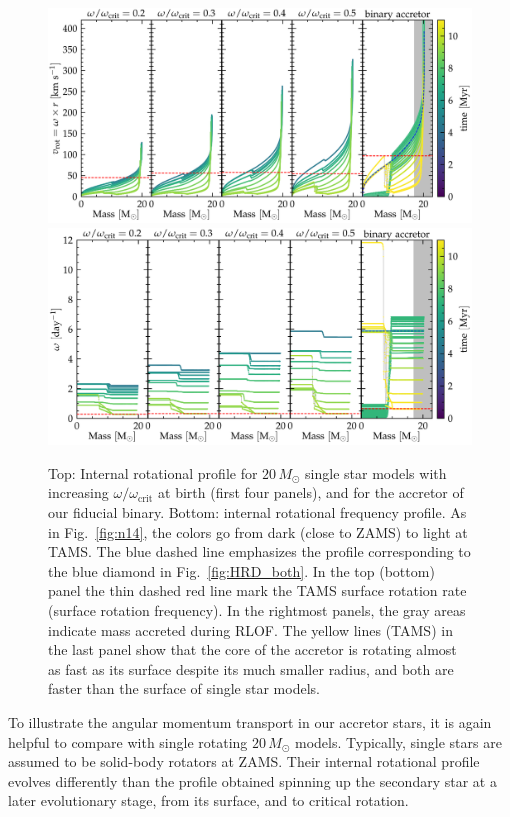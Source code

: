 \documentclass[twocolumn,twocolappendix,trackchanges]{aastex63}
\DeclareRobustCommand{\Figref}[1]{Fig.~\ref{#1}}
\begin{document}
\begin{figure}[tbp]
  \centering
  \includegraphics[width=\textwidth]{zeta_Rotational_struct}
  \includegraphics[width=\textwidth]{omega_struct}
  \caption{Top: Internal rotational profile for $20\,M_\odot$ single
    star models with increasing $\omega/\omega_\mathrm{crit}$ at birth
    (first four panels), and for the accretor of our fiducial
    binary. Bottom: internal rotational frequency profile. As in
    \Figref{fig:n14}, the colors go from dark (close to ZAMS) to light
    at TAMS. The blue dashed line emphasizes the profile
    corresponding to the blue diamond in \Figref{fig:HRD_both}. In
    the top (bottom) panel the thin dashed red line mark the TAMS surface
    rotation rate (surface rotation frequency). In the rightmost panels, the gray areas indicate
    mass accreted during RLOF. The yellow lines (TAMS) in the last
    panel show that the core of the accretor is rotating almost as
    fast as its surface despite its much smaller radius, and both are
    faster than the surface of single star models.}
  \label{fig:struct_rot}
\end{figure}

To illustrate the angular momentum transport in our accretor stars, it
is again helpful to compare with single rotating $20\,M_\odot$
models. Typically, single stars are assumed to be solid-body rotators
at ZAMS. Their internal rotational profile evolves differently than
the profile obtained spinning up the secondary star at a later
evolutionary stage, from its surface, and to critical rotation.
\end{document}
